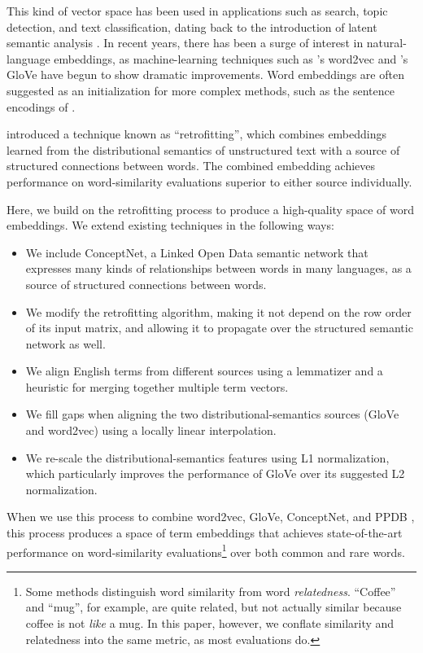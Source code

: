 \documentclass[11pt,letterpaper]{article}
\begin{document}
This kind of vector space has been used in applications such as search, topic
detection, and text classification, dating back to the introduction of latent
semantic analysis \cite{deerwester1990indexing}.  In recent years, there has
been a surge of interest in natural-language embeddings, as machine-learning
techniques such as 's word2vec and
's GloVe have begun to show dramatic improvements.
Word embeddings are often suggested as an initialization for more complex
methods, such as the sentence encodings of .

 introduced a technique
known as ``retrofitting'', which combines embeddings learned from the
distributional semantics of unstructured text with a source of structured
connections between words. The combined embedding achieves performance on
word-similarity evaluations superior to either source individually.

Here, we build on the retrofitting process to produce a high-quality space of
word embeddings. We extend existing techniques in the following ways:

\begin{itemize}
\item We include ConceptNet, a Linked Open Data semantic network that expresses
many kinds of relationships between words in many languages, as a source of
structured connections between words.
\item We modify the retrofitting algorithm, making it not depend on the row
order of its input matrix, and allowing it to propagate over the structured
semantic network as well.
\item We align English terms from different sources using a lemmatizer and a
heuristic for merging together multiple term vectors.
\item We fill gaps when aligning the two distributional-semantics sources
(GloVe and word2vec) using a locally linear interpolation.
\item We re-scale the distributional-semantics features using L1 normalization,
which particularly improves the performance of GloVe over its suggested L2
normalization.
\end{itemize}

When we use this process to combine word2vec, GloVe, ConceptNet, and PPDB
\cite{ganitkevitch2013ppdb}, this process produces a space of term embeddings
that achieves state-of-the-art performance on word-similarity
evaluations\footnote{Some methods distinguish word similarity from word
{\em relatedness}. ``Coffee'' and ``mug'', for example, are quite related,
but not actually similar because coffee is not {\em like} a mug. In this paper,
however, we conflate similarity and relatedness into the same metric, as most
evaluations do.}
over both common and rare words.
\end{document}
